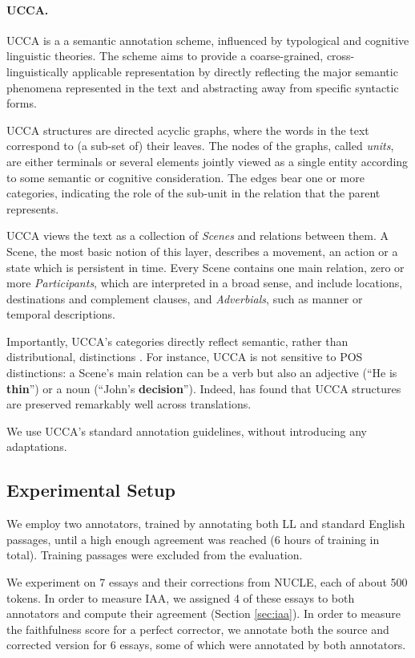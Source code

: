 \documentclass[letter,11pt]{article}
\begin{document}
\paragraph{UCCA.}\label{sec:ucca}
UCCA is a a semantic annotation scheme, influenced
by typological and cognitive linguistic theories.
The scheme aims to provide a coarse-grained, cross-linguistically
applicable representation by directly reflecting the major semantic
phenomena represented in the text and abstracting away from
specific syntactic forms.

UCCA structures are directed acyclic graphs, where the words in the text 
correspond to (a sub-set of) their leaves.
The nodes of the graphs, called {\it units}, are either terminals or several elements jointly
viewed as a single entity according to some semantic or cognitive consideration.
The edges bear one or more categories, indicating the role of 
the sub-unit in the relation that the parent represents.

UCCA views the text as a collection of {\it Scenes} and relations between them.
A Scene, the most basic notion of this layer, describes a movement, 
an action or a state which is persistent in time.
Every Scene contains one main relation, 
zero or more {\it Participants}, 
which are interpreted in a broad sense, 
and include locations, destinations and complement clauses,
and {\it Adverbials}, such as manner or temporal descriptions.

Importantly, UCCA's categories directly reflect semantic, rather than distributional, distinctions .
For instance, UCCA is not sensitive to POS distinctions: a Scene's main relation can be a verb but also an adjective
(``He is {\bf thin}'') or a noun (``John's {\bf decision}'').
Indeed,  has found
that UCCA structures are preserved remarkably well across translations.

We use UCCA's standard annotation guidelines, without introducing any adaptations.

\subsection{Experimental Setup}

We employ two annotators, trained by annotating both LL and standard English
passages, until a high enough agreement was reached (6 hours of training in total).
Training passages were excluded from the evaluation.

We experiment on 7 essays and their corrections from NUCLE, each of about 500 tokens.
In order to measure IAA, we assigned 4 of these essays to both annotators
and compute their agreement (Section \ref{sec:iaa}).
In order to measure the faithfulness score for a perfect corrector, we annotate both
the source and corrected version for 6 essays, some of which were annotated by both annotators.
\end{document}
